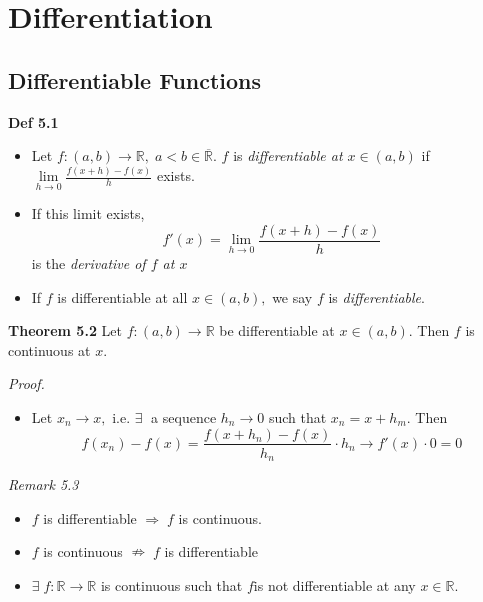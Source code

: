 \documentclass[12pt]{article}
\begin{document}
\section{Differentiation}
\subsection{Differentiable Functions}
\begin{block}{\bf Def 5.1}
\begin{itemize}
\item Let $f\colon(a,b)\to \mathbb{R},\; a<b\in\overline{\mathbb{R}}$. $f$ is {\sl differentiable at $x\in(a,b)$} if $\lim\limits_{h\to0}\frac{f(x+h)-f(x)}{h}$ exists. 

\item If this limit exists, 
$$f'(x)=\lim\limits_{h\to 0}\frac{f(x+h)-f(x)}{h}$$ is the {\sl derivative of $f$ at $x$}

\item If $f$ is differentiable at all $x\in(a,b),$ we say $f$ is {\sl differentiable}.
\end{itemize}
\end{block}

\vspace{1\baselineskip}
\begin{block}{\bf Theorem 5.2} Let $f\colon (a,b)\to \mathbb{R}$ be differentiable at $x\in(a,b).$ Then $f$ is continuous at $x$.\end{block}

\vspace{1\baselineskip}

\begin{block}{\sl Proof.}
\begin{itemize}
    \item Let $x_n\to x,$ i.e. $\exists\;$ a sequence $h_n\to 0$ such that $x_n=x+h_m$. Then 
    $$f(x_n)-f(x) =\frac{f(x+h_n)-f(x)}{h_n}\cdot h_n \longrightarrow f'(x)\cdot 0 = 0$$
\end{itemize}
\end{block}

\vspace{1\baselineskip}
\begin{block}{\sl Remark 5.3}
\begin{itemize}
    \item $f$ is differentiable $\Rightarrow\;f$ is continuous.
    \item $f$ is continuous $\nRightarrow\;f$ is differentiable
    \item $\exists\;f\colon\mathbb{R}\to\mathbb{R}$ is continuous such that $f $is not differentiable at any $x\in\mathbb{R}$.
\end{itemize}
\end{block}
\end{document}
